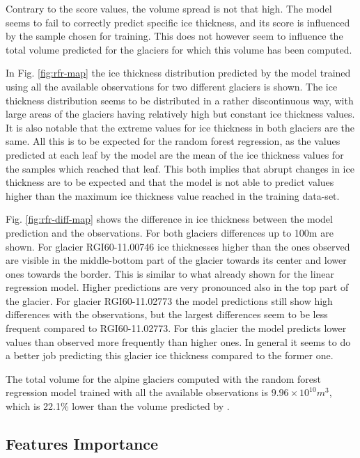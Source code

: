 Contrary to the score values, the volume spread is not that high. The model seems to fail to correctly predict specific ice thickness, and its score is influenced by the sample chosen for training. This does not however seem to influence the total volume predicted for the glaciers for which this volume has been computed.

In Fig. \ref{fig:rfr-map} the ice thickness distribution predicted by the model trained using all the available observations for two different glaciers is shown. The ice thickness distribution seems to be distributed in a rather discontinuous way, with large areas of the glaciers having relatively high but constant ice thickness values. It is also notable that the extreme values for ice thickness in both glaciers are the same. All this is to be expected for the random forest regression, as the values predicted at each leaf by the model are the mean of the ice thickness values for the samples which reached that leaf. This both implies that abrupt changes in ice thickness are to be expected and that the model is not able to predict values higher than the maximum ice thickness value reached in the training data-set.

Fig. \ref{fig:rfr-diff-map} shows the difference in ice thickness between the model prediction and the observations. For both glaciers differences up to 100m are shown. For glacier RGI60-11.00746 ice thicknesses higher than the ones observed are visible in the middle-bottom part of the glacier towards its center and lower ones towards the border. This is similar to what already shown for the linear regression model. Higher predictions are very pronounced also in the top part of the glacier. For glacier RGI60-11.02773 the model predictions still show high differences with the observations, but the largest differences  seem to be less frequent compared to RGI60-11.02773. For this glacier the model predicts lower values than observed more frequently than higher ones. In general it seems to do a better job predicting this glacier ice thickness compared to the former one.

The total volume for the alpine glaciers computed with the random forest regression model trained with all the available observations is $9.96 \times 10^{10}m^3$, which is 22.1\% lower than the volume predicted by \citet{Farinotti2019}.

\subsection{Features Importance}\label{rfr-features}

